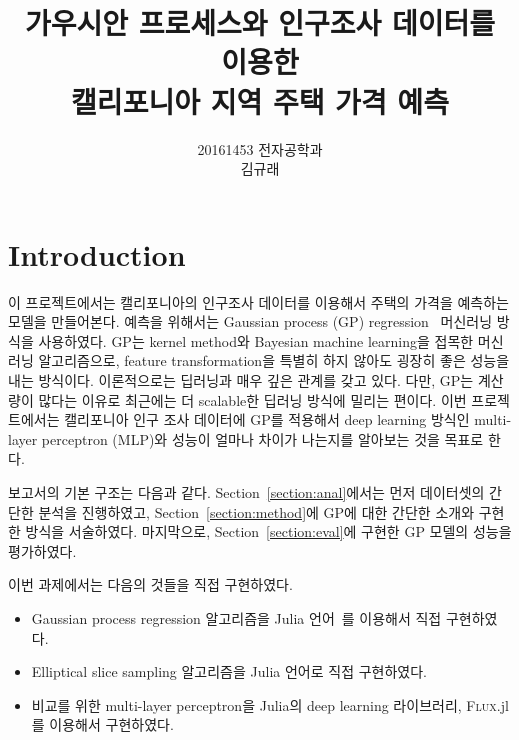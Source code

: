 \documentclass[ba, 11pt]{imsart}
\begin{document}

\begin{frontmatter}
  \title{가우시안 프로세스와 인구조사 데이터를 이용한 \\ 캘리포니아 지역 주택 가격 예측}

\runtitle{}

\begin{aug}
  \author{20161453 전자공학과\\김규래}%
  \address{}


\end{aug}




\end{frontmatter}

\section{Introduction}\label{}
이 프로젝트에서는 캘리포니아의 인구조사 데이터를 이용해서 주택의 가격을 예측하는 모델을 만들어본다.
예측을 위해서는 Gaussian process (GP) regression~\citep{rasmussen_gaussian_2006} 머신러닝 방식을 사용하였다.
GP는 kernel method와 Bayesian machine learning을 접목한 머신러닝 알고리즘으로, feature transformation을 특별히 하지 않아도 굉장히 좋은 성능을 내는 방식이다.
이론적으로는 딥러닝과 매우 깊은 관계를 갖고 있다.
다만, GP는 계산량이 많다는 이유로 최근에는 더 scalable한 딥러닝 방식에 밀리는 편이다.
이번 프로젝트에서는 캘리포니아 인구 조사 데이터에 GP를 적용해서 deep learning 방식인 multi-layer perceptron (MLP)와 성능이 얼마나 차이가 나는지를 알아보는 것을 목표로 한다.

보고서의 기본 구조는 다음과 같다.
Section~\ref{section:anal}에서는 먼저 데이터셋의 간단한 분석을 진행하였고, Section~\ref{section:method}에 GP에 대한 간단한 소개와 구현한 방식을 서술하였다.
마지막으로, Section~\ref{section:eval}에 구현한 GP 모델의 성능을 평가하였다.

이번 과제에서는 다음의 것들을 직접 구현하였다.
\begin{itemize}
  \item Gaussian process regression 알고리즘을 Julia 언어~\citep{bezanson_julia_2017}를 이용해서 직접 구현하였다.
  \item Elliptical slice sampling 알고리즘을 Julia 언어로 직접 구현하였다.
  \item 비교를 위한 multi-layer perceptron을 Julia의 deep learning 라이브러리, \textsc{Flux}.jl를 이용해서 구현하였다.
\end{itemize}
\end{document}
